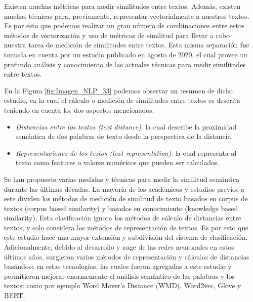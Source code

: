 \documentclass[12pt,a4paper]{article}
\begin{document}
\begin{sloppypar}
Existen muchas métricas para medir similitudes entre textos. Además, existen muchas técnicas para, previamente, representar vectorialmente a nuestros textos. Es por esto que podemos realizar un gran número de combinaciones entre estos métodos de vectorización y uso de métricas de similitud para llevar a cabo nuestra tarea de medición de similitudes entre textos. Esta misma separación fue tomada en cuenta por un estudio publicado en agosto de 2020\cite{similarity_survey}, el cual provee un profundo análisis y conocimiento de las actuales técnicas para medir similitudes entre textos.

En la Figura \ref{fig:Imagen_NLP_33} podemos observar un resumen de dicho estudio, en la cual el cálculo o medición de similitudes entre textos es descrita teniendo en cuenta los dos aspectos mencionados: 
\begin{itemize}
\item \textit{Distancias entre los textos (text distance)}: la cual describe la proximidad semántica de dos palabras de texto desde la perspectiva de la distancia. 
\item \textit{Representaciones de los textos (text representation)}: la cual representa al texto como features o valores numéricos que pueden ser calculados. 
\end{itemize}

Se han propuesto varias medidas y técnicas para medir la similitud semántica durante las últimas décadas. La mayoría de los académicos y estudios previos a este dividen los métodos de medición de similitud de texto basados en corpus de textos (corpus based similarity) y basados en conocimiento (knowledge based similarity)\cite{NLP_16}. Esta clasificación ignora los métodos de cálculo de distancias entre textos, y solo considera los métodos de representación de textos. 
Es por esto que este estudio\cite{similarity_survey} hace una mayor extensión y subdivisión del sistema de clasificación. Adicionalmente, debido al desarrollo y auge de las redes neuronales en estos últimos años, surgieron varios métodos de representación y cálculos de distancias basándose en estas tecnologías, las cuales fueron agregadas a este estudio y permitieron mejorar enormemente el análisis semántico de las palabras y los textos: como por ejemplo Word Mover’s Distance (WMD), Word2vec, Glove y BERT. 
\\\\


\end{sloppypar}
\end{document}
